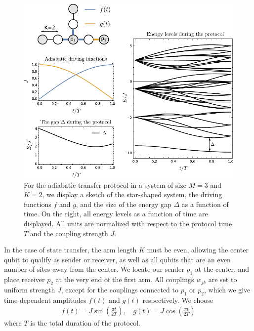 \begin{figure}
\centering
\includegraphics[width=.85\textwidth]{img_manuscript/pltProtocolAndStar_larger.pdf} 
\caption{For the adiabatic transfer protocol in a system of size $M=3$ and $K=2$, we display a sketch of the star-shaped system, the driving functions $f$ and $g$, and the size of the energy gap $\Delta$ as a function of time. On the right, all energy levels as a function of time are displayed. All units are normalized with respect to the protocol time $T$ and the coupling strength $J$.}
\label{fig:elevels}
\end{figure}

In the case of state transfer, the arm length $K$ must be even, allowing the center qubit to qualify as sender or receiver, as well as all qubits that are an even number of sites away from the center. We locate our sender $p_1$ at the center, and place receiver $p_2$ at the very end of the first arm. All couplings $w_{jk}$ are set to uniform strength $J$, except for the couplings connected to $p_1$ or $p_2$, which we give time-dependent amplitudes $f(t)$ and $g(t)$ respectively. We choose
\begin{align}
%
f(t) = J \sin \left( \frac{ \pi t }{2 T} \right), \quad g(t) = J \cos \left( \frac{ \pi t }{2 T} \right)
\label{eqn:fg}
\end{align}
where $T$ is the total duration of the protocol. 


